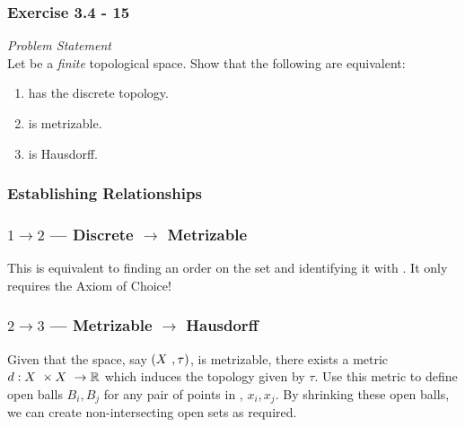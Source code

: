 

\begin{frame}
    \frametitle{Exercise 3.4 - 15}
    \textit{Problem Statement}\\
    Let \topx be a \emph{finite} topological space. Show that the following are
    equivalent:
    \begin{enumerate}
        \item \topx has the discrete topology.
        \item \topx is metrizable.
        \item \topx is Hausdorff.
    \end{enumerate}
\end{frame}

\begin{frame}
    \frametitle{Establishing Relationships}
    \centering

\end{frame}

\begin{frame}
    \frametitle{\(1 \rightarrow 2\) --- Discrete \(\rightarrow\) Metrizable}

    \begin{figure}
        \scalebox{1.4}{}
    \end{figure}

    \pause
    This is equivalent to finding an order on the set and identifying it with
    \naturals. It only requires the Axiom of Choice!

\end{frame}

\begin{frame}
    \frametitle{\(2 \rightarrow 3\) --- Metrizable \(\rightarrow\) Hausdorff}

    Given that the space, say \((X~, \tau)\), is metrizable, there exists a
    metric \(d: X~ \times X~ \to \mathbb{R}\) which induces the topology given
    by \(\tau\). \pause
    Use this metric to define open balls \(B_i, B_j\) for any pair of points in
    \topx, \(x_i, x_j\). \pause By shrinking these open balls, we can create
    non-intersecting open sets as required.
    \pause
    \begin{figure}
        \scalebox{1}{}
    \end{figure}

\end{frame}

